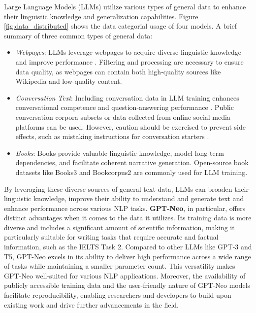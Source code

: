 \documentclass[conference]{IEEEtran}
\begin{document}
Large Language Models (LLMs) utilize various types of general data to enhance their linguistic knowledge and generalization capabilities. Figure \ref{fig:data_distributed} shows the data categorial usage of four models. A brief summary of three common types of general data:

\begin{itemize}
    \item \textit{Webpages}: LLMs leverage webpages to acquire diverse linguistic knowledge and improve performance \cite{unsupervised-multitask-learners}. Filtering and processing are necessary to ensure data quality, as webpages can contain both high-quality sources like Wikipedia and low-quality content.
    \item \textit{Conversation Text}: Including conversation data in LLM training enhances conversational competence \cite{conversation-data-improve-performance} and question-answering performance \cite{enhance-performance-question-answering}. Public conversation corpora subsets or data collected from online social media platforms can be used. However, caution should be exercised to prevent side effects, such as mistaking instructions for conversation starters \cite{side-effect}.
    \item \textit{Books}: Books provide valuable linguistic knowledge, model long-term dependencies, and facilitate coherent narrative generation. Open-source book datasets like Books3 and Bookcorpus2 are commonly used for LLM training.
\end{itemize} 
By leveraging these diverse sources of general text data, LLMs can broaden their linguistic knowledge, improve their ability to understand and generate text and enhance performance across various NLP tasks. \textbf{GPT-Neo}, in particular, offers distinct advantages when it comes to the data it utilizes. Its training data is more diverse and includes a significant amount of scientific information, making it particularly suitable for writing tasks that require accurate and factual information, such as the IELTS Task 2. Compared to other LLMs like GPT-3 and T5, GPT-Neo excels in its ability to deliver high performance across a wide range of tasks while maintaining a smaller parameter count. This versatility makes GPT-Neo well-suited for various NLP applications. Moreover, the availability of publicly accessible training data and the user-friendly nature of GPT-Neo models facilitate reproducibility, enabling researchers and developers to build upon existing work and drive further advancements in the field.\\
\end{document}
